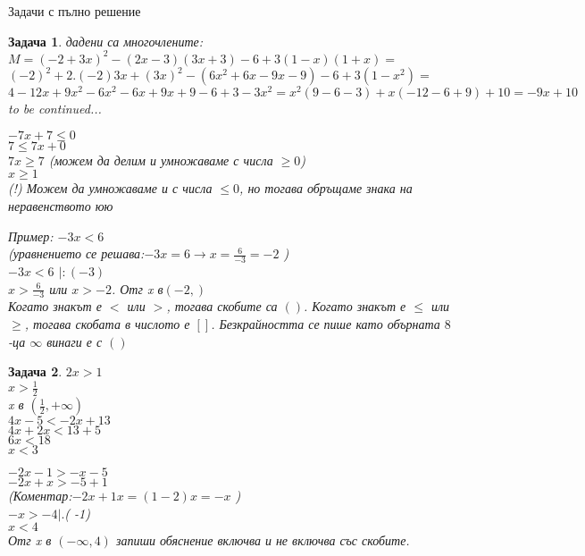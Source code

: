 \documentclass{article}
\theoremstyle{plain}
\newtheorem{problem}{Задача}
\begin{document}
Задачи с пълно решение \\
\begin{problem}
дадени са многочлените: \\
$M = (-2+3x)^2 -(2x-3)(3x+3) -6 +3(1-x)(1+x) = $\\ $(-2)^2 + 2.(-2)3x + (3x)^2  -(6x^2 + 6x -9x -9) -6 +3(1-x^2) =$\\
$4 - 12x + 9x^2 - 6x^2-6x +9x+9 -6 + 3 -3x^2 = x^2(9-6-3)+x(-12-6+9) +10 = -9x+10 $ \\ to be continued...

$-7x+7 \leq 0 $ \\
$ 7 \leq 7x +0 $\\
$ 7x \geq 7 $ (можем да делим и умножаваме с числа $ \geq 0$) \\ 
$ x \geq 1 $ \\
(!) Можем да умножаваме и с числа $\leq 0 $, но тогава обръщаме знака на неравенството юю

Пример:
$-3x < 6$ \\
(уравнението се решава:$-3x = 6 \to x = \frac{6}{-3} = -2 $  ) \\
$-3x < 6$ $|:(-3)$ \\
$x > \frac{6}{-3} $ или $x>-2 $. Отг x в$ (-2,)$ \\
Когато знакът е $<$ или $>$, тогава скобите са $()$. Когато знакът е $\leq $ или $\geq $, тогава скобата в числото е $[] $. Безкрайността се пише като обърната $8$-ца $\infty $ винаги е с $() $


 \end{problem}


\begin{problem}
	$2x > 1 $ \\
	$x > \frac{1}{2} $\\
	x в $(\frac{1}{2}, + \infty) $\\
	
	
	$4x - 5 < -2x + 13 $\\
	$4x +2x < 13 +5 $\\
	$6x < 18 $\\
	$x < 3  $
	
	$ -2x -1 > -x -5 $ \\
	$-2x +x >  -5 +1  $\\
	(Коментар:$-2x + 1x = (1-2)x = -x$ ) \\
	
	$-x > -4 |.$( -1)\\
	$ x < 4 $ \\
	Отг x в $(-\infty , 4) $
	запиши обяснение включва и не включва със скобите.
\end{problem}
\end{document}

